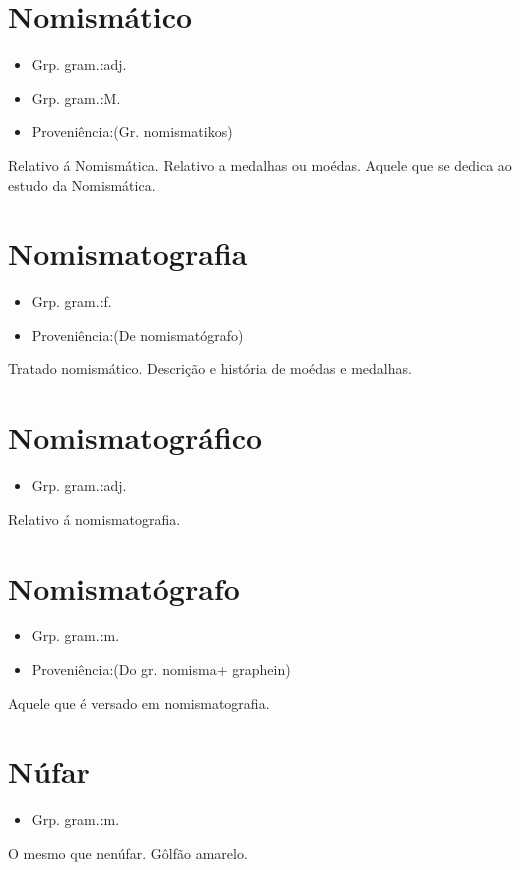 \section{Nomismático}
\begin{itemize}
\item {Grp. gram.:adj.}
\end{itemize}
\begin{itemize}
\item {Grp. gram.:M.}
\end{itemize}
\begin{itemize}
\item {Proveniência:(Gr. \textunderscore nomismatikos\textunderscore )}
\end{itemize}
Relativo á Nomismática.
Relativo a medalhas ou moédas.
Aquele que se dedica ao estudo da Nomismática.
\section{Nomismatografia}
\begin{itemize}
\item {Grp. gram.:f.}
\end{itemize}
\begin{itemize}
\item {Proveniência:(De \textunderscore nomismatógrafo\textunderscore )}
\end{itemize}
Tratado nomismático.
Descrição e história de moédas e medalhas.
\section{Nomismatográfico}
\begin{itemize}
\item {Grp. gram.:adj.}
\end{itemize}
Relativo á nomismatografia.
\section{Nomismatógrafo}
\begin{itemize}
\item {Grp. gram.:m.}
\end{itemize}
\begin{itemize}
\item {Proveniência:(Do gr. \textunderscore nomisma\textunderscore  + \textunderscore graphein\textunderscore )}
\end{itemize}
Aquele que é versado em nomismatografia.
\section{Núfar}
\begin{itemize}
\item {Grp. gram.:m.}
\end{itemize}
O mesmo que \textunderscore nenúfar\textunderscore .
Gôlfão amarelo.
